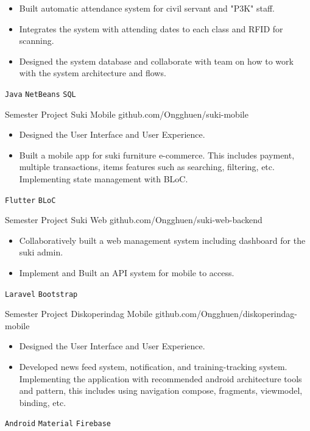 \documentclass[9pt]{developercv} %
\begin{document}
\begin{entrylist}
{\begin{itemize}[noitemsep,topsep=0pt,parsep=0pt,partopsep=0pt, leftmargin=-1pt]
			\item {Built automatic attendance system for civil servant and "P3K" staff.}
			\item {Integrates the system with attending dates to each class and RFID for scanning.}
			\item {Designed the system database and collaborate with team on how to work with the system architecture and flows.}
		\end{itemize}
		\texttt{Java} \slashsep \texttt{NetBeans} \slashsep \texttt{SQL}}
	\entry
	{Semester Project}
	{Suki Mobile}
	{github.com/Ongghuen/suki-mobile}
	{\vspace{-10 pt}
		\begin{itemize}[noitemsep,topsep=0pt,parsep=0pt,partopsep=0pt, leftmargin=-1pt]
			\item Designed the User Interface and User Experience.
			\item Built a mobile app for suki furniture e-commerce. This includes payment, multiple transactions, items features such as searching, filtering, etc. Implementing state management with BLoC.
		\end{itemize}
		\texttt{Flutter} \slashsep \texttt{BLoC}}
	\entry
	{Semester Project}
	{Suki Web}
	{github.com/Ongghuen/suki-web-backend}
	{\vspace{-10 pt}
		\begin{itemize}[noitemsep,topsep=0pt,parsep=0pt,partopsep=0pt, leftmargin=-1pt]
			\item Collaboratively built a web management system including dashboard for the suki admin.
			\item Implement and Built an API system for mobile to access.
		\end{itemize}
		\texttt{Laravel} \slashsep \texttt{Bootstrap}}
	\entry
	{Semester Project}
	{Diskoperindag Mobile}
	{github.com/Ongghuen/diskoperindag-mobile}
	{\vspace{-10 pt}
		\begin{itemize}[noitemsep,topsep=0pt,parsep=0pt,partopsep=0pt, leftmargin=-1pt]
			\item Designed the User Interface and User Experience.
			\item Developed news feed system, notification, and training-tracking system. Implementing the application with recommended android architecture tools and pattern, this includes using navigation compose, fragments, viewmodel, binding, etc.
		\end{itemize}
		\texttt{Android} \slashsep \texttt{Material} \slashsep \texttt{Firebase}
}
\end{entrylist}
\end{document}
